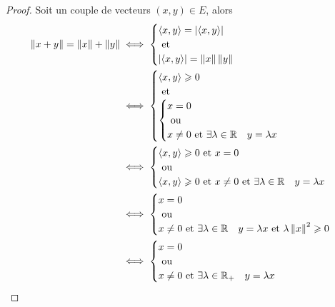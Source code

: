 \begin{proof}
  Soit un couple de  vecteurs \((x,y) \in E\), alors
  \begin{align*}
    \left\lVert x+y\right\rVert = \left\lVert x\right\rVert+\left\lVert y\right\rVert &\iff
    \begin{cases}
      \left\langle{x},{y}\right\rangle = \left\lvert\left\langle{x},{y}\right\rangle\right\rvert \\ 
      \text{~et~} \\
      \left\lvert\left\langle{x},{y}\right\rangle\right\rvert = \left\lVert x\right\rVert\left\lVert y\right\rVert
    \end{cases} \\
    &\iff
    \begin{cases}
      \left\langle{x},{y}\right\rangle \geqslant 0 \\ 
      \text{~et~} \\ 
      \begin{cases}
        x=0 \\ 
        \text{~ou~} \\ 
        x\neq 0 \text{~et~} \exists \lambda \in \mathbb{R} \quad y=\lambda x
      \end{cases}
    \end{cases}\\
    & \iff
    \begin{cases}
      \left\langle{x},{y}\right\rangle \geqslant 0 \text{~et~} x = 0 \\
      \text{~ou~} \\
      \left\langle{x},{y}\right\rangle \geqslant 0 \text{~et~} x \neq 0 \text{~et~} \exists \lambda \in \mathbb{R} \quad y=\lambda x
    \end{cases}\\
    & \iff
    \begin{cases} 
      x=0 \\ 
      \text{~ou~} \\ 
      x \neq 0 \text{~et~} \exists \lambda \in \mathbb{R} \quad y=\lambda x \text{~et~} \lambda\left\lVert x\right\rVert^2 \geqslant 0
    \end{cases} \\
    & \iff 
    \begin{cases} 
      x=0 \\ 
      \text{~ou~} \\ 
      x \neq 0 \text{~et~} \exists \lambda \in \mathbb{R}_{+} \quad y=\lambda x 
    \end{cases}
  \end{align*}
\end{proof}

